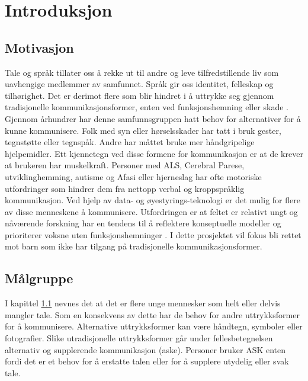 \documentclass[phd,tocprelim]{cornell}
\begin{document}
\normalspacing \setcounter{page}{1} 
\pagestyle{cornell} \addtolength{\parskip}{0.5\baselineskip}



\chapter{Introduksjon}




\section{Motivasjon}
\label{sec:motivasjon}

Tale og språk tillater oss å rekke ut til andre og leve tilfredstillende liv som uavhengige medlemmer av samfunnet. Språk gir oss identitet, felleskap  og tilhørighet. Det er derimot flere som blir hindret i å uttrykke seg gjennom tradisjonelle kommunikasjonsformer, enten ved funksjonshemning eller skade  \cite{tobii}. Gjennom århundrer har denne samfunnsgruppen hatt behov for alternativer for å kunne kommunisere. Folk med syn eller hørselsskader har tatt i bruk gester, tegnstøtte eller tegnspåk. Andre har måttet bruke mer håndgripelige hjelpemidler. Ett kjennetegn ved disse formene for kommunikasjon er at de krever at brukeren har muskelkraft. Personer med ALS, Cerebral Parese, utviklinghemming, autisme og Afasi eller hjerneslag har ofte motoriske utfordringer som hindrer dem fra nettopp verbal og kroppspråklig kommunikasjon. Ved hjelp av data- og øyestyrings-teknologi er det mulig for flere av disse menneskene å kommunisere. Utfordringen er at feltet er relativt ungt og nåværende forskning har en tendens til å reflektere konseptuelle modeller og prioriterer voksne uten funksjonshemninger \cite{aac}. I dette prosjektet vil fokus bli rettet mot barn som ikke har tilgang på tradisjonelle kommunikasjonsformer.




\section{Målgruppe}

I kapittel \ref{sec:motivasjon} nevnes det at det er flere unge mennesker som helt eller delvis mangler tale. Som en konsekvens av dette har de behov for andre uttrykksformer for å kommunisere. Alternative uttrykksformer kan være håndtegn, symboler eller fotografier. Slike utradisjonelle uttrykksformer går under fellesbetegnelsen alternativ og supplerende kommunikasjon (\gls{aske}).
Personer bruker ASK enten fordi det er et behov for å erstatte talen eller for å supplere utydelig eller svak tale.
\end{document}
